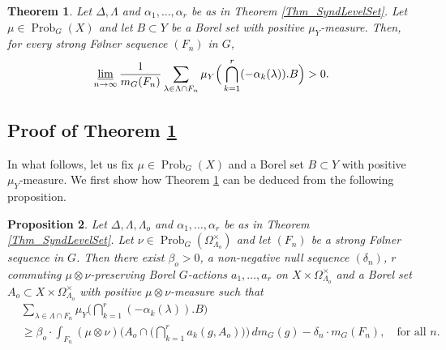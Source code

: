 \documentclass[12pt,reqno,a4paper]{amsart}
\numberwithin{equation}{section}
\newcommand{\ra}{\rightarrow}
\DeclareMathOperator{\Prob}{Prob}
\theoremstyle{theorem}
\newtheorem{theorem}{Theorem}[section]
\newtheorem{proposition}[theorem]{Proposition}
\theoremstyle{task}
\theoremstyle{definition}
\begin{document}
\begin{theorem}
\label{Thm_PosAvLambda}
Let $\Delta, \Lambda$ and $\alpha_1,\ldots,\alpha_r$ be as in Theorem \ref{Thm_SyndLevelSet}. Let $\mu \in \Prob_G(X)$ and let $B \subset Y$
be a Borel set with positive $\mu_Y$-measure. Then, for every strong F\o lner 
sequence $(F_n)$ in $G$, 
\[
\varliminf_{n \ra \infty}
\frac{1}{m_G(F_n)} \sum_{\lambda \in \Lambda \cap F_n} \mu_Y\Big( \bigcap_{k=1}^r (-\alpha_k(\lambda)).B\Big) > 0.
\]
\end{theorem}

\subsection{Proof of Theorem \ref{Thm_PosAvLambda}}

In what follows, let us fix $\mu \in \Prob_G(X)$ and a Borel set $B \subset Y$
with positive $\mu_Y$-measure. We first show how Theorem \ref{Thm_PosAvLambda}
can be deduced from the following proposition. 

\begin{proposition}
\label{Prop_LowBndAvLambda}
Let $\Delta, \Lambda, \Lambda_o$ and $\alpha_1,\ldots,\alpha_r$ be as in Theorem \ref{Thm_SyndLevelSet}. Let $\nu \in \Prob_G(\Omega_{\Lambda_o}^{\times})$ and let $(F_n)$ be a strong F\o lner sequence in $G$. Then there exist $\beta_o > 0$, a non-negative null sequence $(\delta_n)$, $r$ commuting $\mu \otimes \nu$-preserving Borel $G$-actions $a_1,\ldots,a_r$ on $X \times \Omega_{\Lambda_o}^{\times}$ and a Borel set $A_o \subset X \times \Omega_{\Lambda_o}^{\times}$
with positive $\mu \otimes \nu$-measure such that
\begin{align*}
&\sum_{\lambda \in \Lambda \cap F_n} \mu_Y\Big( \bigcap_{k=1}^r (-\alpha_k(\lambda)).B\Big) \\[0.1cm]
&\geq \beta_o \cdot \int_{F_n} (\mu \otimes \nu)\Big(A_o \cap \Big( \bigcap_{k=1}^r a_k(g,A_o) \Big) \Big) \, dm_G(g) - \delta_n \cdot m_G(F_n), \quad \textrm{for all $n$}.
\end{align*}
\end{proposition}
\end{document}
